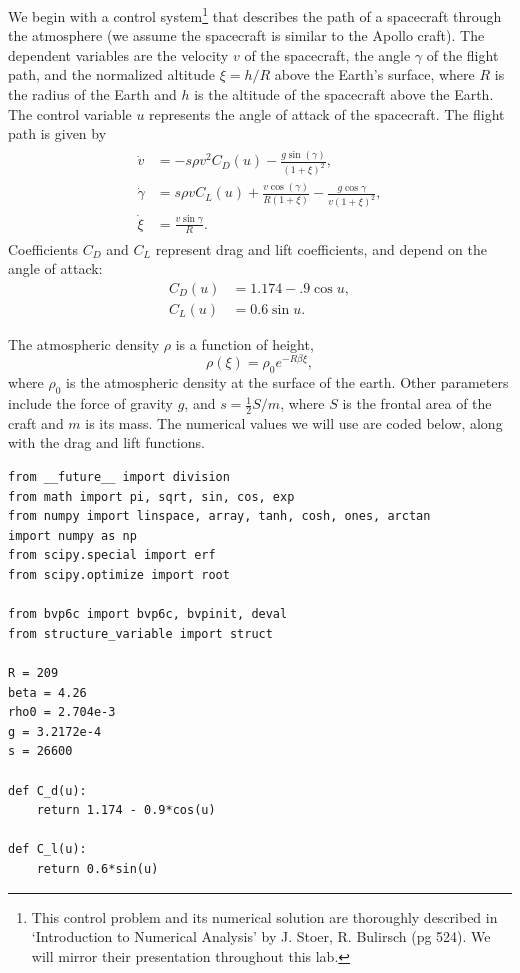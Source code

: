 We begin with a control system\footnote{This control problem and its numerical solution are thoroughly described in `Introduction to Numerical Analysis' by J. Stoer, R. Bulirsch (pg 524). 
We will mirror their presentation throughout this lab.}
that describes the path of a spacecraft through the atmosphere 
(we assume the spacecraft is similar to the Apollo craft).
The dependent variables are the velocity $v$ of the spacecraft,  
the angle $\gamma$ of the flight path, 
and the normalized altitude $\xi=h/R$ above the Earth's surface, where $R$ is the radius of the Earth and $h$ is the altitude of the spacecraft above the Earth.
The control variable  $u$ represents the angle of attack of the spacecraft. 
The flight path is given by 
\begin{align}
\begin{split}
\dot{v} &= -s\rho v^2C_D(u) - \frac{g\sin(\gamma)}{(1+\xi)^2},\\
\dot{\gamma} &= s \rho v C_L(u) + \frac{v \cos(\gamma)}{R(1+\xi)} - \frac{g \cos \gamma}{v(1+\xi)^2},\\
\dot{\xi} &= \frac{v \sin \gamma}{R}.
\end{split} \label{eqn:reentry:control_system}
\end{align}
Coefficients $C_D$ and $C_L$ represent drag and lift coefficients, and depend on the angle of attack:
\begin{align*}
 C_D(u) &= 1.174 - .9\cos u, \\
 C_L(u) &= 0.6\sin u.
\end{align*}
 
The atmospheric density $\rho$ is a function of height,
\[\rho(\xi) = \rho_0e^{-R\beta\xi},
\] where  $\rho_0$ is the atmospheric density at the surface of the earth. 
Other parameters include the force of gravity $g$, and $s = \frac{1}{2}S/m$, where $S$ is the frontal area of the craft and $m$ is its mass.
The numerical values we will use are coded below, along with the drag and lift functions. 
\begin{lstlisting}
from __future__ import division
from math import pi, sqrt, sin, cos, exp
from numpy import linspace, array, tanh, cosh, ones, arctan
import numpy as np
from scipy.special import erf
from scipy.optimize import root

from bvp6c import bvp6c, bvpinit, deval
from structure_variable import struct

R = 209
beta = 4.26
rho0 = 2.704e-3
g = 3.2172e-4
s = 26600

def C_d(u):
	return 1.174 - 0.9*cos(u)

def C_l(u):
	return 0.6*sin(u)
\end{lstlisting}


